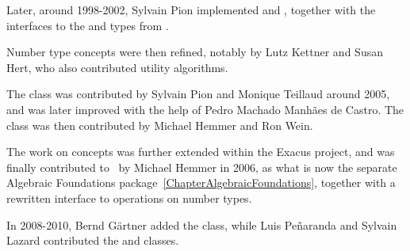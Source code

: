 Later, around 1998-2002, Sylvain Pion implemented 
 and , together with the interfaces to
the  and  types from \gmp.

Number type concepts were then refined, notably by Lutz Kettner and
Susan Hert, who also contributed utility algorithms.

The  class was contributed by Sylvain Pion and Monique Teillaud
around 2005, and was later improved with the help of Pedro Machado Manh\~aes
de Castro.  The class  was then contributed by Michael
Hemmer and Ron Wein.

The work on concepts was further extended within the Exacus project, and was finally
contributed to \cgal\ by Michael Hemmer in 2006, as what is now the separate
Algebraic Foundations package~\ref{ChapterAlgebraicFoundations}, together with
a rewritten interface to operations on number types.

In 2008-2010, Bernd G\"artner added the  class, while
Luis Pe\~naranda and Sylvain Lazard contributed the  and
 classes.



%
%


% 
